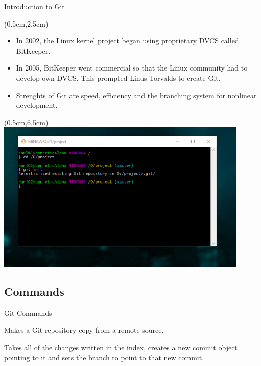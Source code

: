 \documentclass[xcolor=dvipsnames]{beamer}
\begin{document}
\begin{frame}{Introduction to Git}

\begin{textblock*}{12cm}(0.5cm,2.5cm) %
\begin{itemize}

	\item In 2002, the Linux kernel project began using proprietary DVCS called BitKeeper.
	\item In 2005, BitKeeper went commercial so that the Linux community had to develop 				own DVCS. This prompted Linus Torvalds to create Git.
	\item Strenghts of Git are speed, efficiency and the branching system for nonlinear
	      development.

\end{itemize}
\end{textblock*}

\begin{textblock*}{5cm}(0.5cm,6.5cm) %
\includegraphics[width = 0.9\textwidth]{gitConsole.png}
\end{textblock*}

\end{frame}

\subsection{Commands}

\begin{frame}{Git Commands}

\begin{tcolorbox}[title=git clone]
Makes a Git repository copy from a remote source.
\end{tcolorbox}

\begin{tcolorbox}[title=git commit]
Takes all of the changes written in the index, creates a new commit object pointing to it and sets the branch to point to that new commit.
\end{tcolorbox}

\end{frame}
\end{document}
